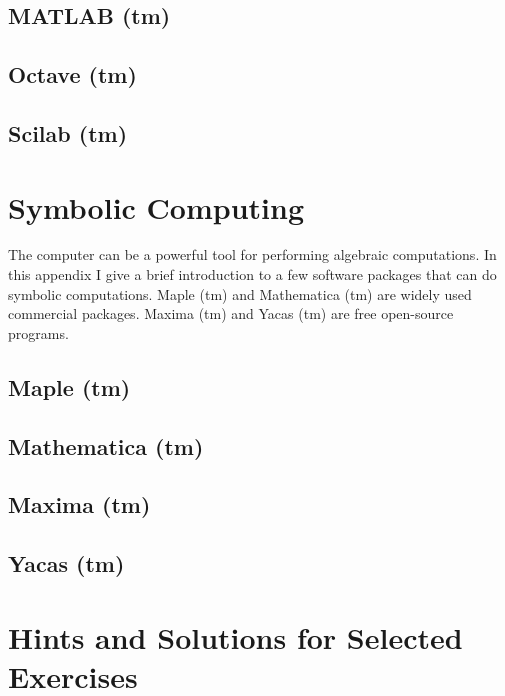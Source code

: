 \documentclass[reqno]{immbook}
\begin{document}
\section{MATLAB (tm)}
\section{Octave (tm)}
\section{Scilab (tm)}
%
%
%
\chapter{Symbolic Computing}
The computer can be a powerful tool for performing
algebraic computations.  In this appendix I give a brief introduction
to a few software packages that can do symbolic computations.
Maple (tm) and Mathematica (tm) are widely used commercial
packages.  Maxima (tm) and Yacas (tm) are free open-source
programs.
\section{Maple (tm)}
\section{Mathematica (tm)}
\section{Maxima (tm)}
\section{Yacas (tm)}
%
\chapter[Hints and Solutions]{Hints and Solutions for Selected Exercises}
\end{document}

